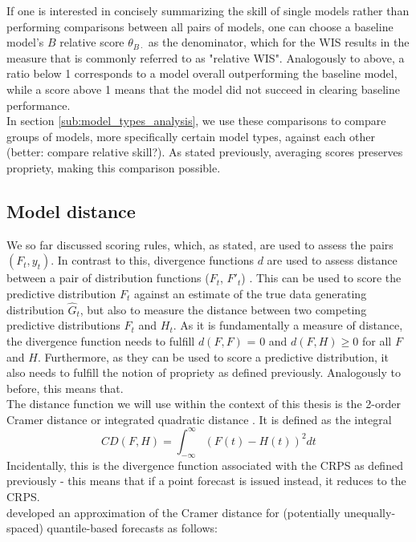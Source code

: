 If one is interested in concisely summarizing the skill of single models rather than performing comparisons between all pairs of models, one can choose a baseline model's $B$ relative score $\theta_{B\cdot}$ as the denominator, which for the WIS results in the measure that is commonly referred to as "relative WIS". Analogously to above, a ratio below 1 corresponds to a model overall outperforming the baseline model, while a score above 1 means that the model did not succeed in clearing baseline performance.\\
In section \ref{sub:model_types_analysis}, we use these comparisons to compare groups of models, more specifically certain model types, against each other (better: compare relative skill?). As stated previously, averaging scores preserves propriety, making this comparison possible.
\subsection{Model distance}
We so far discussed scoring rules, which, as stated, are used to assess the pairs $(F_t, y_t)$. In contrast to this, divergence functions $d$ are used to assess distance between a pair of distribution functions ($F_t$, $F'_t$) \cite{thorarinsdottir_using_2013}. This can be used to score the predictive distribution $F_t$ against an estimate of the true data generating distribution $\hat{G}_t$, but also to measure the distance between two competing predictive distributions $F_t$ and $H_t$. As it is fundamentally a measure of distance, the divergence function needs to fulfill $d(F,F)$ = 0 and $d(F,H)\geq 0$ for all $F$ and $H$. Furthermore, as they can be used to score a predictive distribution, it also needs to fulfill the notion of propriety as defined previously. Analogously to before, this means that. \\
The distance function we will use within the context of this thesis is the 2-order Cramer distance or integrated quadratic distance \cite{thorarinsdottir_using_2013}. It is defined as the integral
\begin{equation}
CD(F, H) = \int_{-\infty}^{\infty}\left(F(t) - H(t) \right)^2dt
\end{equation}
Incidentally, this is the divergence function associated with the CRPS as defined previously - this means that if a point forecast is issued instead, it reduces to the CRPS.\\
\cite{wang_covidhubutils_2022} developed an approximation of the Cramer distance for (potentially unequally-spaced) quantile-based forecasts as follows:
